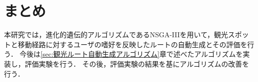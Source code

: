 \section{まとめ}\label{sec:まとめ}
本研究では，進化的遺伝的アルゴリズムであるNSGA-I\hspace{-.1em}I\hspace{-.1em}Iを用いて，観光スポットと移動経路に対するユーザの嗜好を反映したルートの自動生成とその評価を行う．
今後は\ref{sec:観光ルート自動生成アルゴリズム}章で述べたアルゴリズムを実装し，評価実験を行う．
その後，評価実験の結果を基にアルゴリズムの改善を行う．







